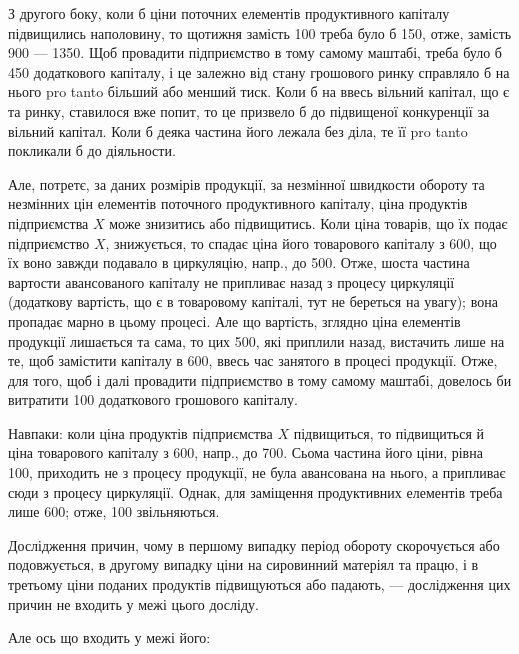 З другого боку, коли б ціни поточних елементів продуктивного капіталу
підвищились наполовину, то щотижня замість 100 треба
було б 150, отже, замість 900 — 1350. Щоб
провадити підприємство в тому самому маштабі, треба було б 450 додаткового капіталу, і це залежно від стану грошового ринку
справляло б на нього pro tanto більший або менший тиск. Коли б на
ввесь вільний капітал, що є та ринку, ставилося вже попит, то це призвело
б до підвищеної конкуренції за вільний капітал. Коли б деяка частина
його лежала без діла, те її pro tanto покликали б до діяльности.

Але, потретє, за даних розмірів продукції, за незмінної швидкости
обороту та незмінних цін елементів поточного продуктивного капіталу,
ціна продуктів підприємства $X$ може знизитись або підвищитись. Коли
ціна товарів, що їх подає підприємство $X$, знижується, то спадає ціна
його товарового капіталу з 600, що їх воно завжди подавало
в циркуляцію, напр., до 500. Отже, шоста частина вартости авансованого
капіталу не припливає назад з процесу циркуляції (додаткову вартість,
що є в товаровому капіталі, тут не береться на увагу); вона пропадає
марно в цьому процесі. Але що вартість, зглядно ціна елементів продукції
лишається та сама, то цих 500, які приплили назад, вистачить
лише на те, щоб замістити  капіталу в 600, ввесь час
занятого в процесі продукції. Отже, для того, щоб і далі провадити підприємство
в тому самому маштабі, довелось би витратити 100
додаткового грошового капіталу.

Навпаки: коли ціна продуктів підприємства $X$ підвищиться, то підвищиться
й ціна товарового капіталу з 600, напр., до 700. Сьома частина його ціни, рівна 100, приходить не з
процесу продукції, не була авансована на нього, а припливає сюди з
процесу циркуляції. Однак, для заміщення продуктивних елементів треба
лише 600; отже, 100 звільняються.

Дослідження причин, чому в першому випадку період обороту
скорочується або подовжується, в другому випадку ціни на сировинний
матеріял та працю, і в третьому ціни поданих продуктів підвищуються
або падають, — дослідження цих причин не входить у межі цього досліду.

Але ось що входить у межі його:

